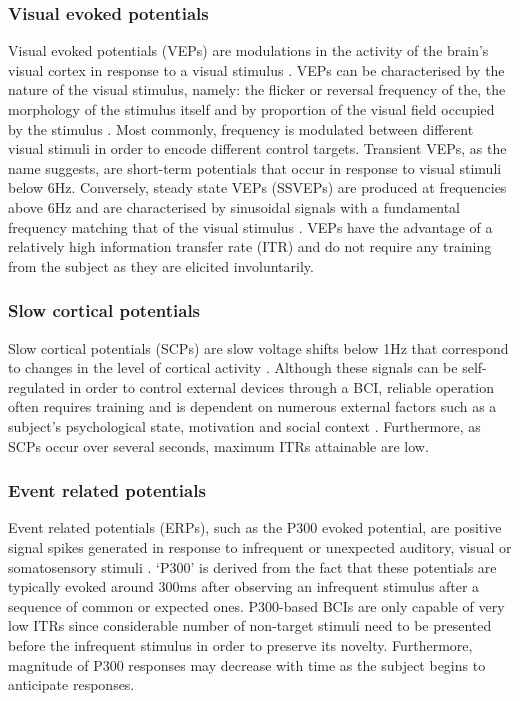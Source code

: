 \subsubsection{Visual evoked potentials}
Visual evoked potentials (VEPs) are modulations in the activity of the brain's visual cortex in response to a visual stimulus \cite{bromm-veps}. VEPs can be characterised by the nature of the visual stimulus, namely: the flicker or reversal frequency of the, the morphology of the stimulus itself and by proportion of the visual field occupied by the stimulus \cite{bci-survey-nicolas-alonso}. Most commonly, frequency is modulated between different visual stimuli in order to encode different control targets. Transient VEPs, as the name suggests, are short-term potentials that occur in response to visual stimuli below 6Hz. Conversely, steady state VEPs (SSVEPs) are produced at frequencies above 6Hz and are characterised by sinusoidal signals with a fundamental frequency matching that of the visual stimulus \cite{Xie2016}. VEPs have the advantage of a relatively high information transfer rate (ITR) and do not require any training from the subject as they are elicited involuntarily. 

\subsubsection{Slow cortical potentials}
Slow cortical potentials (SCPs) are slow voltage shifts below 1Hz that correspond to changes in the level of cortical activity \cite{bci-survey-nicolas-alonso}. Although these signals can be self-regulated in order to control external devices through a BCI, reliable operation often requires training and is dependent on numerous external factors such as a subject's psychological state, motivation and social context \cite{bci-survey-nicolas-alonso}. Furthermore, as SCPs occur over several seconds, maximum ITRs attainable are low.

\subsubsection{Event related potentials}
Event related potentials (ERPs), such as the P300 evoked potential, are positive signal spikes generated in response to infrequent or unexpected auditory, visual or somatosensory stimuli \cite{bci-survey-nicolas-alonso}. `P300' is derived from the fact that these potentials are typically evoked around 300ms after observing an infrequent stimulus after a sequence of common or expected ones. P300-based BCIs are only capable of very low ITRs since considerable number of non-target stimuli need to be presented before the infrequent stimulus in order to preserve its novelty. Furthermore, magnitude of P300 responses may decrease with time as the subject begins to anticipate responses. 

